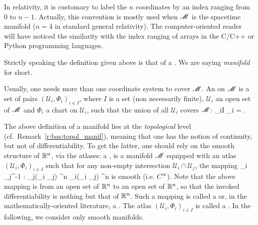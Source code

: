 \begin{remark}
In relativity, it is customary to label the $n$ coordinates by an index
ranging from $0$ to $n-1$. Actually, this convention is mostly used when $\mathscr{M}$ is the spacetime manifold ($n=4$ in standard general relativity). The computer-oriented reader will have noticed the similarity
with the index ranging of arrays in the C/C++ or Python programming languages.
\end{remark}


\begin{remark} \label{r:bas:topol_manif}
Strictly speaking the definition given above is that of a . We are saying \emph{manifold} for short.
\end{remark}


Usually, one needs more than one coordinate system to cover $\mathscr{M}$.
An  on $\mathscr{M}$ is a set of pairs
$(\mathcal{U}_i,\Phi_i)_{i\in I}$,  where $I$ is a set (non necessarily finite), $\mathcal{U}_i$ an open set of $\mathscr{M}$ and $\Phi_i$ a chart on $\mathcal{U}_i$,
such that the union of all $\mathcal{U}_i$ covers $\mathscr{M}$:
\be
    \bigcup_{i\in I} _i = \M.
\ee

The above definition of a manifold lies at the \emph{topological} level
(cf.~Remark~\ref{r:bas:topol_manif}), meaning that one has the notion of continuity, but not of differentiability. To get the latter, one should rely on the smooth structure of $\mathbb{R}^n$, via the atlases:
a ,
is a manifold $\mathscr{M}$ equipped with an atlas
$(\mathcal{U}_i,\Phi_i)_{i\in I}$ such that for any non-empty intersection
$\mathcal{U}_i \cap \mathcal{U}_j$, the mapping
\be \label{e:bas:transition_map}
    \Phi_i \circ \Phi_j^{-1} : \Phi_j(_i \cap {}_j)
    \subset \R^n \longrightarrow \Phi_i(_i \cap {}_j)
    \subset \R^n
\ee
is smooth (i.e. $C^\infty$).
Note that the above mapping is from an open set of $\mathbb{R}^n$ to an open set of $\mathbb{R}^n$, so that the invoked differentiability is nothing but that of $\mathbb{R}^n$.
Such a mapping is called a  or, in the mathematically-oriented literature, a
.
The atlas $(\mathcal{U}_i,\Phi_i)_{i\in I}$  is called a
.
In the following, we consider only smooth manifolds.


